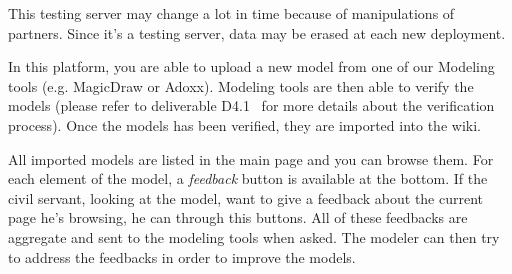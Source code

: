 \documentclass{learnpad}
\begin{document}
This testing server may change a lot in time because of manipulations of
partners.  Since it's a testing server, data may be erased at each new
deployment.

In this platform, you are able to upload a new model from one of our Modeling
tools (e.g. MagicDraw or Adoxx).  Modeling tools are then able to verify the 
models (please refer to deliverable D4.1~\cite{learnpad:D4.1} for more details 
about the verification process). Once the models has been verified, they are 
imported into the wiki.

All imported models are listed in the main page and you can browse them.  For
each element of the model, a \textit{feedback} button is available at the 
bottom. If the civil servant, looking at the model, want to give a feedback 
about the current page he's browsing, he can through this buttons.  All of 
these feedbacks are aggregate and sent to the modeling tools when asked.  The 
modeler can then try to address the feedbacks in order to improve the models.







 

\end{document}
